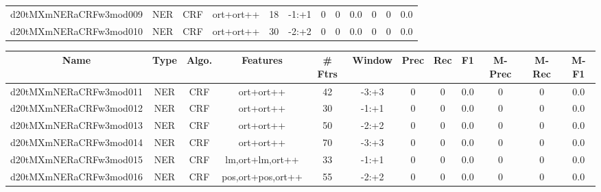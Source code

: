 \documentclass[a4paper]{article}
\begin{document}
\begin{landscape}
\begin{center}
\begin{tabular}{ |c|c|c|c|c|c|c|c|c|c|c|c|}
 
 	
 	\small{ d20tMXmNERaCRFw3mod009 } & \small{ NER} & \small{  CRF }  & ort+ort++  &  18 &  \small{  -1:+1 }  &  0 & 0 & 0.0  &  0 & 0 & 0.0 \\
 	

 
 	
 	\small{ d20tMXmNERaCRFw3mod010 } & \small{ NER} & \small{  CRF }  & ort+ort++  &  30 &  \small{  -2:+2 }  &  0 & 0 & 0.0  &  0 & 0 & 0.0 \\
 	
 \hline
\end{tabular}
\end{center}




\begin{center}
\begin{tabular}{ |c|c|c|c|c|c|c|c|c|c|c|c|} 
 \hline
 	Name & Type & Algo. & Features & \# Ftrs & Window & Prec & Rec & F1 & M-Prec & M-Rec & M-F1\\
 \hline

 	

 
 	
 	\small{ d20tMXmNERaCRFw3mod011 } & \small{ NER} & \small{  CRF }  & ort+ort++  &  42 &  \small{  -3:+3 }  &  0 & 0 & 0.0  &  0 & 0 & 0.0 \\
 	

 
 	
 	\small{ d20tMXmNERaCRFw3mod012 } & \small{ NER} & \small{  CRF }  & ort+ort++  &  30 &  \small{  -1:+1 }  &  0 & 0 & 0.0  &  0 & 0 & 0.0 \\
 	

 
 	
 	\small{ d20tMXmNERaCRFw3mod013 } & \small{ NER} & \small{  CRF }  & ort+ort++  &  50 &  \small{  -2:+2 }  &  0 & 0 & 0.0  &  0 & 0 & 0.0 \\
 	

 
 	
 	\small{ d20tMXmNERaCRFw3mod014 } & \small{ NER} & \small{  CRF }  & ort+ort++  &  70 &  \small{  -3:+3 }  &  0 & 0 & 0.0  &  0 & 0 & 0.0 \\
 	

 
 	
 	\small{ d20tMXmNERaCRFw3mod015 } & \small{ NER} & \small{  CRF }  & lm,ort+lm,ort++  &  33 &  \small{  -1:+1 }  &  0 & 0 & 0.0  &  0 & 0 & 0.0 \\
 	

 
 	
 	\small{ d20tMXmNERaCRFw3mod016 } & \small{ NER} & \small{  CRF }  & pos,ort+pos,ort++  &  55 &  \small{  -2:+2 }  &  0 & 0 & 0.0  &  0 & 0 & 0.0 \\
 	


\end{tabular}
\end{center}
\end{landscape}
\end{document}
